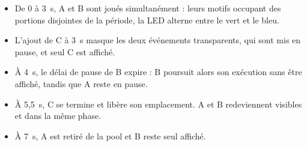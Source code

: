 \begin{itemize}
	\item De 0 à 3~s, A et B sont joués simultanément : leurs motifs occupant des portions disjointes de la période, la LED
	alterne entre le vert et le bleu.\\

	\item L'ajout de C à 3~s masque les deux événements transparents, qui sont mis en pause, et seul C est affiché.\\

	\item À 4~s, le délai de pause de B expire : B poursuit alors son exécution sans être affiché, tandis que A reste en pause.\\

	\item À 5,5~s, C se termine et libère son emplacement. A et B redeviennent visibles et dans la même phase.\\

	\item À 7~s, A est retiré de la pool et B reste seul affiché.
\end{itemize}

